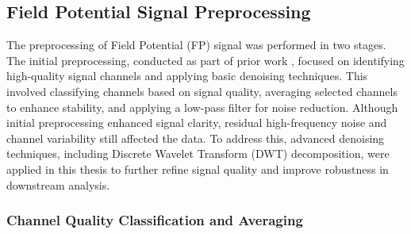 \documentclass{report}
\begin{document}
    \subsection{Field Potential Signal Preprocessing}

    The preprocessing of Field Potential (FP) signal was performed in two stages. The initial preprocessing, conducted as part of prior work \cite{Sarwar2024}, focused on identifying high-quality signal channels and applying basic denoising techniques. This involved classifying channels based on signal quality, averaging selected channels to enhance stability, and applying a low-pass filter for noise reduction. Although initial preprocessing enhanced signal clarity, residual high-frequency noise and channel variability still affected the data. To address this, advanced denoising techniques, including Discrete Wavelet Transform (DWT) decomposition, were applied in this thesis to further refine signal quality and improve robustness in downstream analysis.
    
    \subsubsection{Channel Quality Classification and Averaging}
    \label{channel-quality-classification}
    
\end{document}
